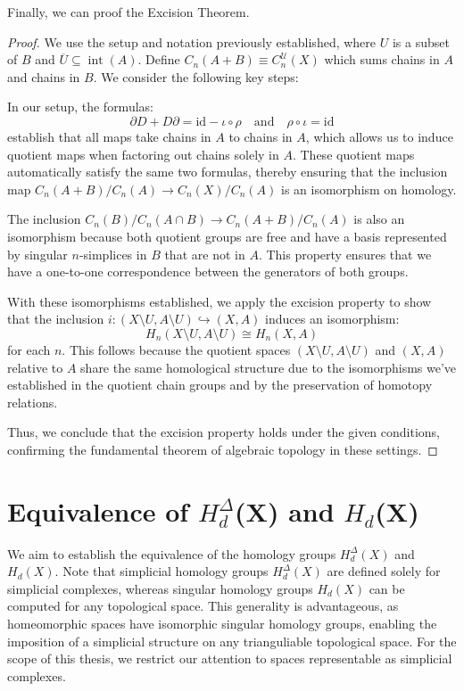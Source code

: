 Finally, we can proof the Excision Theorem.

\begin{proof}
We use the setup and notation previously established, where \( U \) is a subset of \( B \) and \( \overline{U} \subseteq \operatorname{int}(A) \). Define \( C_n(A + B) \equiv C^{\mathcal{U}}_n(X) \) which sums chains in \( A \) and chains in \( B \). We consider the following key steps:

In our setup, the formulas:
\[
\partial D + D \partial = \text{id} - \iota \circ \rho \quad \text{and} \quad \rho \circ \iota = \text{id}
\]
establish that all maps take chains in \( A \) to chains in \( A \), which allows us to induce quotient maps when factoring out chains solely in \( A \). These quotient maps automatically satisfy the same two formulas, thereby ensuring that the inclusion map \( C_n(A + B)/C_n(A) \to C_n(X)/C_n(A) \) is an isomorphism on homology.

The inclusion \( C_n(B)/C_n(A \cap B) \to C_n(A + B)/C_n(A) \) is also an isomorphism because both quotient groups are free and have a basis represented by singular \( n \)-simplices in \( B \) that are not in \( A \). This property ensures that we have a one-to-one correspondence between the generators of both groups.

With these isomorphisms established, we apply the excision property to show that the inclusion \( i: (X \setminus U, A \setminus U) \hookrightarrow (X, A) \) induces an isomorphism:
\[
H_n(X \setminus U, A \setminus U) \cong H_n(X, A)
\]
for each \( n \). This follows because the quotient spaces \( (X \setminus U, A \setminus U) \) and \( (X, A) \) relative to \( A \) share the same homological structure due to the isomorphisms we've established in the quotient chain groups and by the preservation of homotopy relations.

Thus, we conclude that the excision property holds under the given conditions, confirming the fundamental theorem of algebraic topology in these settings.
\end{proof}

\section{Equivalence of $H_{d}^{\Delta}$(X) and $H_{d}$(X)}
\label{HomologicalEquivalence}
We aim to establish the equivalence of the homology groups $H^{\Delta}_{d}(X)$
and $H_{d}(X)$. Note that simplicial homology groups $H^{\Delta}_{d}(X)$ are defined
solely for simplicial complexes, whereas singular homology groups $H_{d}(X)$ can
be computed for any topological space. This generality is advantageous, as
homeomorphic spaces have isomorphic singular homology groups, enabling the imposition
of a simplicial structure on any trianguliable topological space. For the scope
of this thesis, we restrict our attention to spaces representable as simplicial complexes.


